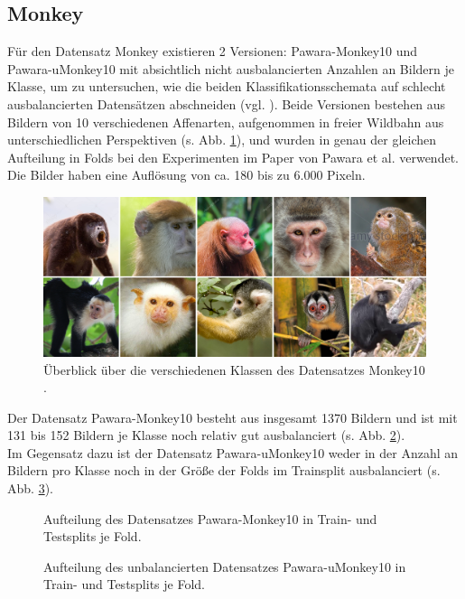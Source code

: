 \subsection{Monkey}
Für den Datensatz Monkey \cite{pawaraWebsiteDatensaetze} existieren 2 Versionen: Pawara-Monkey10 und Pawara-uMonkey10 mit absichtlich nicht ausbalancierten Anzahlen an Bildern je Klasse, um zu untersuchen, wie die beiden Klassifikationsschemata auf schlecht ausbalancierten Datensätzen abschneiden (vgl. \cite{pawaraWebsiteDatensaetze}). Beide Versionen bestehen aus Bildern von 10 verschiedenen Affenarten, aufgenommen in freier Wildbahn aus unterschiedlichen Perspektiven (s. Abb. \ref{fig:monkeyUeberblick}), und wurden in genau der gleichen Aufteilung in Folds bei den Experimenten im Paper von Pawara et al. \cite{pawaraPaper} verwendet.
Die Bilder haben eine Auflösung von ca. 180 bis zu 6.000 Pixeln.
\begin{figure}[H]
\centering
\includegraphics[scale=0.08]{img/2_monkey10-image.jpg}
\caption{Überblick über die verschiedenen Klassen des Datensatzes Monkey10 \cite{pawaraMonkey}.}
\label{fig:monkeyUeberblick}
\end{figure}

Der Datensatz Pawara-Monkey10 besteht aus insgesamt 1370 Bildern und ist mit 131 bis 152 Bildern je Klasse noch relativ gut ausbalanciert (s. Abb. \ref{fig:Pawara-Monkey10Zusammensetzung}).\\

Im Gegensatz dazu ist der Datensatz Pawara-uMonkey10 weder in der Anzahl an Bildern pro Klasse noch in der Größe der Folds im Trainsplit ausbalanciert (s. Abb. \ref{fig:Pawara-uMonkey10Zusammensetzung}). 


\begin{figure}[H]
\begin{adjustbox}{width=1.2\textwidth, center}

\end{adjustbox}
\caption{Aufteilung des Datensatzes Pawara-Monkey10 \cite{pawaraWebsiteDatensaetze} in Train- und Testsplits je Fold.}
\label{fig:Pawara-Monkey10Zusammensetzung}
\end{figure}
\begin{figure}[H]
\begin{adjustbox}{width=1.2\textwidth, center}

\end{adjustbox}
\caption{Aufteilung des unbalancierten Datensatzes Pawara-uMonkey10 \cite{pawaraWebsiteDatensaetze} in Train- und Testsplits je Fold.}
\label{fig:Pawara-uMonkey10Zusammensetzung}
\end{figure}





